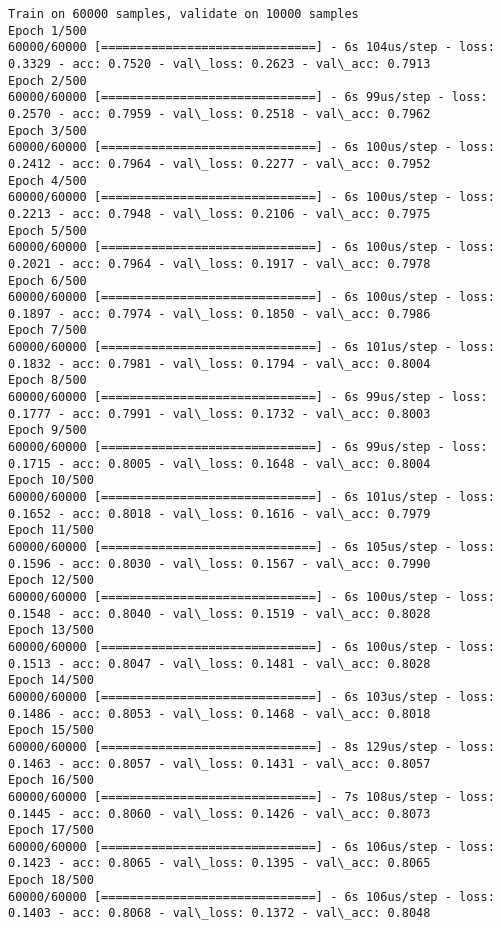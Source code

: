 \documentclass[11pt]{article}
\begin{document}
    \begin{Verbatim}[commandchars=\\\{\}]
Train on 60000 samples, validate on 10000 samples
Epoch 1/500
60000/60000 [==============================] - 6s 104us/step - loss: 0.3329 - acc: 0.7520 - val\_loss: 0.2623 - val\_acc: 0.7913
Epoch 2/500
60000/60000 [==============================] - 6s 99us/step - loss: 0.2570 - acc: 0.7959 - val\_loss: 0.2518 - val\_acc: 0.7962
Epoch 3/500
60000/60000 [==============================] - 6s 100us/step - loss: 0.2412 - acc: 0.7964 - val\_loss: 0.2277 - val\_acc: 0.7952
Epoch 4/500
60000/60000 [==============================] - 6s 100us/step - loss: 0.2213 - acc: 0.7948 - val\_loss: 0.2106 - val\_acc: 0.7975
Epoch 5/500
60000/60000 [==============================] - 6s 100us/step - loss: 0.2021 - acc: 0.7964 - val\_loss: 0.1917 - val\_acc: 0.7978
Epoch 6/500
60000/60000 [==============================] - 6s 100us/step - loss: 0.1897 - acc: 0.7974 - val\_loss: 0.1850 - val\_acc: 0.7986
Epoch 7/500
60000/60000 [==============================] - 6s 101us/step - loss: 0.1832 - acc: 0.7981 - val\_loss: 0.1794 - val\_acc: 0.8004
Epoch 8/500
60000/60000 [==============================] - 6s 99us/step - loss: 0.1777 - acc: 0.7991 - val\_loss: 0.1732 - val\_acc: 0.8003
Epoch 9/500
60000/60000 [==============================] - 6s 99us/step - loss: 0.1715 - acc: 0.8005 - val\_loss: 0.1648 - val\_acc: 0.8004
Epoch 10/500
60000/60000 [==============================] - 6s 101us/step - loss: 0.1652 - acc: 0.8018 - val\_loss: 0.1616 - val\_acc: 0.7979
Epoch 11/500
60000/60000 [==============================] - 6s 105us/step - loss: 0.1596 - acc: 0.8030 - val\_loss: 0.1567 - val\_acc: 0.7990
Epoch 12/500
60000/60000 [==============================] - 6s 100us/step - loss: 0.1548 - acc: 0.8040 - val\_loss: 0.1519 - val\_acc: 0.8028
Epoch 13/500
60000/60000 [==============================] - 6s 100us/step - loss: 0.1513 - acc: 0.8047 - val\_loss: 0.1481 - val\_acc: 0.8028
Epoch 14/500
60000/60000 [==============================] - 6s 103us/step - loss: 0.1486 - acc: 0.8053 - val\_loss: 0.1468 - val\_acc: 0.8018
Epoch 15/500
60000/60000 [==============================] - 8s 129us/step - loss: 0.1463 - acc: 0.8057 - val\_loss: 0.1431 - val\_acc: 0.8057
Epoch 16/500
60000/60000 [==============================] - 7s 108us/step - loss: 0.1445 - acc: 0.8060 - val\_loss: 0.1426 - val\_acc: 0.8073
Epoch 17/500
60000/60000 [==============================] - 6s 106us/step - loss: 0.1423 - acc: 0.8065 - val\_loss: 0.1395 - val\_acc: 0.8065
Epoch 18/500
60000/60000 [==============================] - 6s 106us/step - loss: 0.1403 - acc: 0.8068 - val\_loss: 0.1372 - val\_acc: 0.8048

\end{Verbatim}
\end{document}

